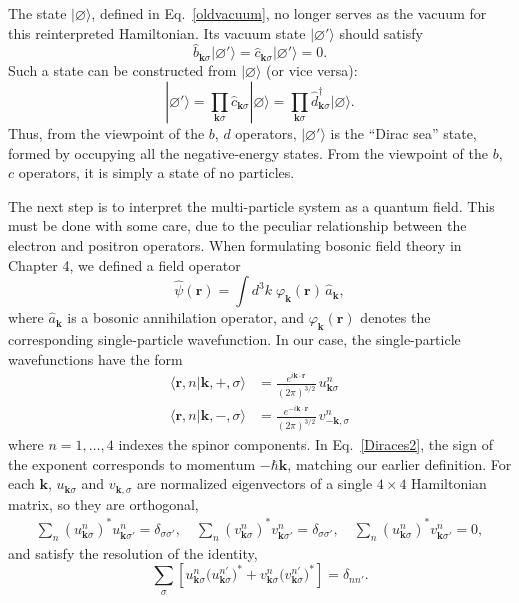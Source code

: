 \documentclass[prx,12pt]{revtex4-2}
\begin{document}
The state $|\varnothing\rangle$, defined in Eq.~\eqref{oldvacuum}, no
longer serves as the vacuum for this reinterpreted Hamiltonian.  Its
vacuum state $|\varnothing'\rangle$ should satisfy
\begin{equation}
  \hat{b}_{\mathbf{k}\sigma} |\varnothing'\rangle =
  \hat{c}_{\mathbf{k}\sigma} |\varnothing'\rangle = 0.
\end{equation}
Such a state can be constructed from $|\varnothing\rangle$ (or vice
versa):
\begin{equation}
  |\varnothing'\rangle
  = \prod_{\mathbf{k}\sigma} \hat{c}_{\mathbf{k}\sigma} |\varnothing\rangle
  = \prod_{\mathbf{k}\sigma} \hat{d}_{\mathbf{k}\sigma}^\dagger
  |\varnothing\rangle.
\end{equation}
Thus, from the viewpoint of the $b$, $d$ operators,
$|\varnothing'\rangle$ is the ``Dirac sea'' state, formed by occupying
all the negative-energy states.  From the viewpoint of the $b$, $c$
operators, it is simply a state of no particles.

The next step is to interpret the multi-particle system as a quantum
field.  This must be done with some care, due to the peculiar
relationship between the electron and positron operators.  When
formulating bosonic field theory in Chapter 4, we defined a field
operator
\begin{equation}
  \hat{\psi}(\mathbf{r})
  = \int d^3k \; \varphi_{\mathbf{k}}(\mathbf{r}) \, \hat{a}_{\mathbf{k}},
  \label{psidef_old}
\end{equation}
where $\hat{a}_{\mathbf{k}}$ is a bosonic annihilation operator, and
$\varphi_{\mathbf{k}}(\mathbf{r})$ denotes the corresponding
single-particle wavefunction.  In our case, the single-particle
wavefunctions have the form
\begin{align}
  \langle \mathbf{r}, n | \mathbf{k}, +, \sigma\rangle
  &= \frac{e^{i\mathbf{k}\cdot \mathbf{r}}}{(2\pi)^{3/2}} \, u_{\mathbf{k}\sigma}^n
  \label{Diraces1} \\
  \langle \mathbf{r}, n | \mathbf{k}, -, \sigma\rangle
  &= \frac{e^{-i\mathbf{k}\cdot \mathbf{r}}}{(2\pi)^{3/2}} \, v_{-\mathbf{k},\sigma}^n
  \label{Diraces2}
\end{align}
where $n = 1, \dots, 4$ indexes the spinor components.  In
Eq.~\eqref{Diraces2}, the sign of the exponent corresponds to momentum
$-\hbar\mathbf{k}$, matching our earlier definition.  For each
$\mathbf{k}$, $u_{\mathbf{k}\sigma}$ and $v_{\mathbf{k},\sigma}$ are
normalized eigenvectors of a single $4\times4$ Hamiltonian matrix, so
they are orthogonal,
\begin{align}
  \sum_n \left(u_{\mathbf{k}\sigma}^n\right)^* u_{\mathbf{k}\sigma'}^n
  = \delta_{\sigma\sigma'}, \quad
  \sum_n \left(v_{\mathbf{k}\sigma}^n\right)^* v_{\mathbf{k}\sigma'}^n
  = \delta_{\sigma\sigma'}, \quad
  \sum_n \left(u_{\mathbf{k}\sigma}^n\right)^* v_{\mathbf{k}\sigma'}^n
  = 0,
\end{align} 
and satisfy the resolution of the identity,
\begin{equation}
  \sum_\sigma \left[
    u_{\mathbf{k}\sigma}^n \big(u_{\mathbf{k}\sigma}^{n'}\big)^*
    + v_{\mathbf{k}\sigma}^n \big(v_{\mathbf{k}\sigma}^{n'}\big)^*\right]
  = \delta_{nn'}.
  \label{iresolv}
\end{equation}
\end{document}
